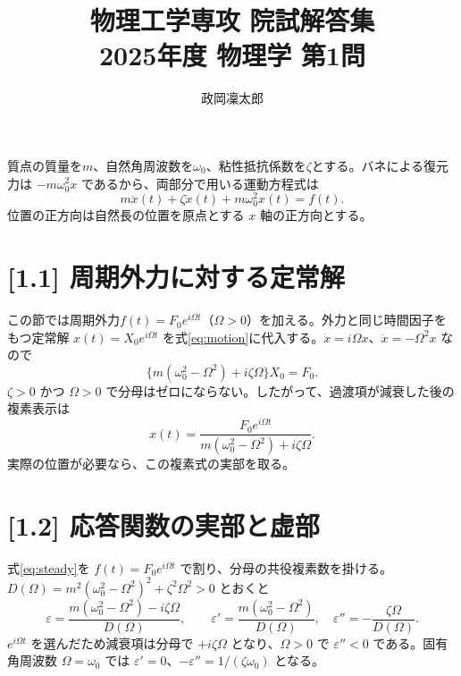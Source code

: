 \documentclass[10pt,a4paper]{article}
\title{物理工学専攻 院試解答集\\2025年度 物理学 第1問}
\author{政岡凜太郎}
\date{}
\begin{document}
\maketitle

質点の質量を$m$、自然角周波数を$\omega_0$、粘性抵抗係数を$\zeta$とする。バネによる復元力は $-m\omega_0^2x$ であるから、両部分で用いる運動方程式は
\begin{equation}
 m\ddot x(t)+\zeta\dot x(t)+m\omega_0^2x(t)=f(t).
 \label{eq:motion}
\end{equation}
位置の正方向は自然長の位置を原点とする $x$ 軸の正方向とする。

\section*{[1.1] 周期外力に対する定常解}
この節では周期外力$f(t)=F_0e^{i\Omega t}$（$\Omega>0$）を加える。外力と同じ時間因子をもつ定常解 $x(t)=X_0e^{i\Omega t}$ を式\eqref{eq:motion}に代入する。$\dot x=i\Omega x$、$\ddot x=-\Omega^2x$ なので
\[
\{m(\omega_0^2-\Omega^2)+i\zeta\Omega\}X_0=F_0.
\]
$\zeta>0$ かつ $\Omega>0$ で分母はゼロにならない。したがって、過渡項が減衰した後の複素表示は
\begin{equation}
\boxed{x(t)=\frac{F_0e^{i\Omega t}}{m(\omega_0^2-\Omega^2)+i\zeta\Omega}}.
\label{eq:steady}
\end{equation}
実際の位置が必要なら、この複素式の実部を取る。

\section*{[1.2] 応答関数の実部と虚部}
式\eqref{eq:steady}を $f(t)=F_0e^{i\Omega t}$ で割り、分母の共役複素数を掛ける。$D(\Omega)=m^2(\omega_0^2-\Omega^2)^2+\zeta^2\Omega^2>0$ とおくと
\begin{equation}
\varepsilon=\frac{m(\omega_0^2-\Omega^2)-i\zeta\Omega}{D(\Omega)},\qquad
\boxed{\varepsilon'=\frac{m(\omega_0^2-\Omega^2)}{D(\Omega)},\quad
\varepsilon''=-\frac{\zeta\Omega}{D(\Omega)}}.
\label{eq:response}
\end{equation}
$e^{i\Omega t}$ を選んだため減衰項は分母で $+i\zeta\Omega$ となり、$\Omega>0$ で $\varepsilon''<0$ である。固有角周波数 $\Omega=\omega_0$ では $\varepsilon'=0$、$-\varepsilon''=1/(\zeta\omega_0)$ となる。
\end{document}
